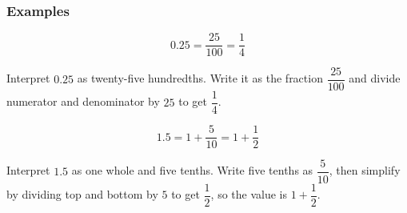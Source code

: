 \documentclass[12pt]{book}
\begin{document}
  \subsubsection*{Examples}
  
  \[
  0.25 = \dfrac{25}{100} = \dfrac{1}{4}
  \]
  
  Interpret $0.25$ as twenty-five hundredths.  
  Write it as the fraction $\dfrac{25}{100}$ and divide numerator and denominator by $25$ to get $\dfrac{1}{4}$.
  
  
  
  
  \[
  1.5 = 1 + \dfrac{5}{10} = 1 + \dfrac{1}{2}
  \]
  
  Interpret $1.5$ as one whole and five tenths.  
  Write five tenths as $\dfrac{5}{10}$, then simplify by dividing top and bottom by $5$ to get $\dfrac{1}{2}$, so the value is $1+\dfrac{1}{2}$.
  
  




\end{document}
